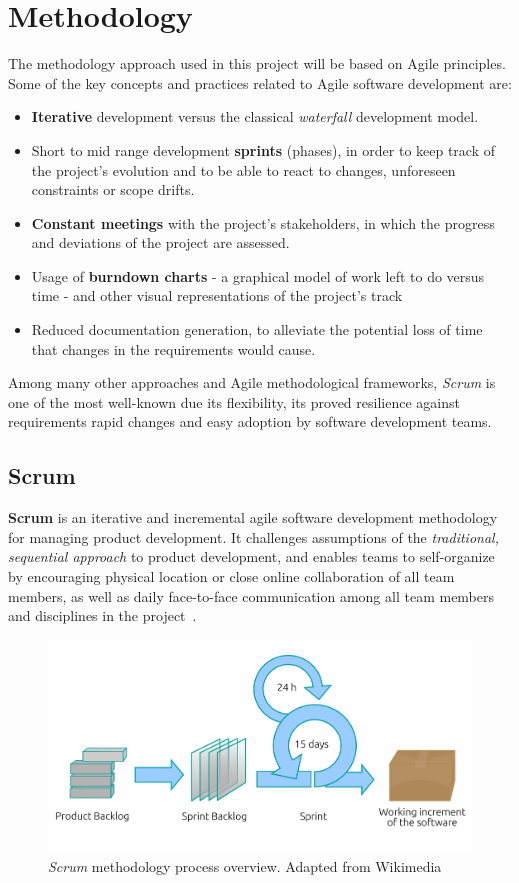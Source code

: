\section{Methodology}
\label{Management:Methodology}

The methodology approach used in this project will be based on Agile principles. Some of the key concepts and practices related to Agile software development are:

\begin{itemize}
	\item \textbf{Iterative} development versus the classical \textit{waterfall} development model.
	\item Short to mid range development \textbf{sprints} (phases), in order to keep track of the project’s evolution and to be able to react to changes, unforeseen constraints or scope drifts.
	\item \textbf{Constant meetings} with the project’s stakeholders, in which the progress and deviations of the project are assessed.
	\item Usage of \textbf{burndown charts} - a graphical model of work left to do versus time - and other visual representations of the project's track
	\item Reduced documentation generation, to alleviate the potential loss of time that changes in the requirements would cause.
\end{itemize}

Among many other approaches and Agile methodological frameworks, \textit{Scrum} is one of the most well-known due its flexibility, its proved resilience against requirements rapid changes and easy adoption by software development teams.

\subsection{Scrum}

\textbf{Scrum} is an iterative and incremental agile software development methodology for managing product development. It challenges assumptions of the \textit{traditional, sequential approach} to product development, and enables teams to self-organize by encouraging physical location or close online collaboration of all team members, as well as daily face-to-face communication among all team members and disciplines in the project~\citep{web:Wiki:Scrum}.

\begin{figure}
	\centering
	\includegraphics[width=0.8\linewidth]{figures/scrum.pdf}
	\caption{\textit{Scrum} methodology process overview. Adapted from Wikimedia~\citep{web:Wiki:ScrumProcess}}
	\label{fig:scrum}
\end{figure}

